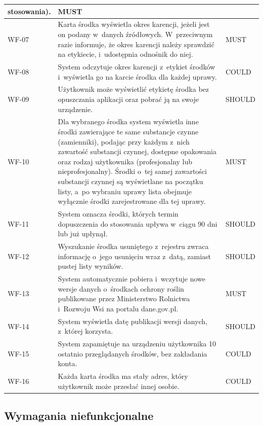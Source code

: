 \begin{longtable}{|p{1.4cm}|p{11.4cm}|p{1.6cm}|}
stosowania). & MUST \\
\hline
WF-07 & Karta środka wyświetla okres karencji, jeżeli jest on podany
w~danych źródłowych. W~przeciwnym razie informuje, że okres karencji należy
sprawdzić na etykiecie, i~udostępnia odnośnik do niej. & MUST \\
\hline
WF-08 & System odczytuje okres karencji z~etykiet środków i~wyświetla go na
karcie środka dla każdej uprawy. & COULD \\
\hline
WF-09 & Użytkownik może wyświetlić etykietę środka bez opuszczania aplikacji
oraz pobrać ją na swoje urządzenie. & SHOULD \\
\hline
WF-10 & Dla wybranego środka system wyświetla inne środki zawierające te
same substancje czynne (zamienniki), podając przy każdym z~nich zawartość
substancji czynnej, dostępne opakowania oraz rodzaj użytkownika
(profesjonalny lub nieprofesjonalny). Środki o~tej samej zawartości
substancji czynnej są wyświetlane na początku listy, a~po wybraniu uprawy
lista obejmuje wyłącznie środki zarejestrowane dla tej uprawy. & MUST \\
\hline
WF-11 & System oznacza środki, których termin dopuszczenia do stosowania
upływa w~ciągu 90 dni lub już upłynął. & SHOULD \\
\hline
WF-12 & Wyszukanie środka usuniętego z~rejestru zwraca informację o~jego
usunięciu wraz z~datą, zamiast pustej listy wyników. & SHOULD \\
\hline
WF-13 & System automatycznie pobiera i~wczytuje nowe wersje danych
o~środkach ochrony roślin publikowane przez Ministerstwo Rolnictwa i~Rozwoju
Wsi na portalu dane.gov.pl. & MUST \\
\hline
WF-14 & System wyświetla datę publikacji wersji danych, z~której korzysta.
& SHOULD \\
\hline
WF-15 & System zapamiętuje na urządzeniu użytkownika 10 ostatnio
przeglądanych środków, bez zakładania konta. & COULD \\
\hline
WF-16 & Każda karta środka ma stały adres, który użytkownik może przesłać
innej osobie. & COULD \\
\hline
\end{longtable}
\endgroup

\subsection{Wymagania niefunkcjonalne}

